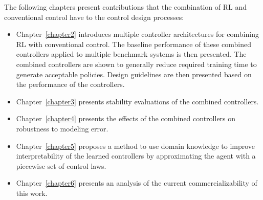 The following chapters present contributions that the combination of RL and conventional control have to the control design processes:
\begin{itemize}
	\item Chapter~\ref{chapter2} introduces multiple controller architectures for combining RL with conventional control. The baseline performance of these combined controllers applied to multiple benchmark systems is then presented. The combined controllers are shown to generally reduce required training time to generate acceptable policies. Design guidelines are then presented based on the performance of the controllers.
	\item Chapter~\ref{chapter3} presents stability evaluations of the combined controllers.
	\item Chapter~\ref{chapter4} presents the effects of the combined controllers on robustness to modeling error.
	\item Chapter~\ref{chapter5} proposes a method to use domain knowledge to improve interpretability of the learned controllers by approximating the agent with a piecewise set of control laws.
	\item Chapter~\ref{chapter6} presents an analysis of the current commercializability of this work.
\end{itemize}


